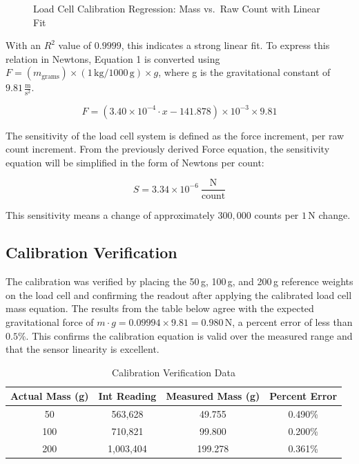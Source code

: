 \documentclass{article}
\begin{document}
\begin{figure}[H]
    \centering
    \caption{Load Cell Calibration Regression: Mass vs.\ Raw Count with Linear Fit}
    \label{fig:cal_reg}
\end{figure}

\noindent With an $R^2$ value of $0.9999$, this indicates a strong linear fit. To express this relation in Newtons, Equation 1 is converted using $F = (m_\text{grams}) \times (1\,\text{kg}/1000\,\text{g}) \times g$, where g is the gravitational constant of $9.81\,\frac{\text{m}}{\text{s}^2}$.

\begin{equation}
    F = \left(3.40 \times 10^{-4} \cdot x - 141.878\right) \times 10^{-3} \times 9.81
    \label{eq:cal_force}
\end{equation}

The sensitivity of the load cell system is defined as the force increment, per raw count increment. From the previously derived Force equation, the sensitivity equation will be simplified in the form of Newtons per count:

\begin{equation}
    S = 3.34 \times 10^{-6}\ \frac{\text{N}}{\text{count}}
\end{equation}

\noindent This sensitivity means a change of approximately $300{,}000$ counts per $1$\,N change.

\subsection{Calibration Verification}

The calibration was verified by placing the 50\,g, 100\,g, and 200\,g reference weights on the load cell and confirming the readout after applying the calibrated load cell mass equation. The results from the table below agree with the expected gravitational force of $m \cdot g = 0.09994 \times 9.81 = 0.980$\,N, a percent error of less than $0.5\%$. This confirms the calibration equation is valid over the measured range and that the sensor linearity is excellent.

\begin{table}[h]
    \centering
    \caption{Calibration Verification Data}
    \label{tab:calibration_verification}
    \begin{tabular}{cccc}
        \toprule
        \textbf{Actual Mass (g)} & \textbf{Int Reading} & \textbf{Measured Mass (g)} & \textbf{Percent Error} \\
        \midrule
        50  & 563,628   & 49.755     & 0.490\% \\
        100 & 710,821   & 99.800     & 0.200\% \\
        200 & 1,003,404 & 199.278  & 0.361\% \\
        \bottomrule
    \end{tabular}
\end{table}
\end{document}
